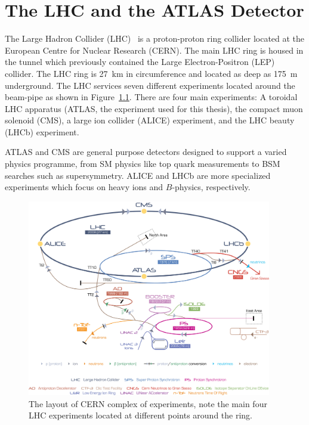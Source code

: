 \newcommand{\rphi}{\ensuremath{R\textrm{-}\phi}}
\newcommand{\T}{\ensuremath{\mathbf{T}}}
\newcommand{\Tms}{\ensuremath{\T_{\textrm{MS}}}}
\newcommand{\Tid}{\ensuremath{\T_{\textrm{ID}}}}
\newcommand{\C}{\ensuremath{\mathbf{C}}}
\newcommand{\Cms}{\ensuremath{\C_{\textrm{MS}}}}
\newcommand{\Cid}{\ensuremath{\C_{\textrm{ID}}}}
\newcommand{\kt}{\ensuremath{k_{\textrm{T}}}}
\newcommand{\kti}{\ensuremath{k_{\textrm{T},i}}}
\newcommand{\ktj}{\ensuremath{k_{\textrm{T},j}}}
\newcommand{\dij}{\ensuremath{\Delta_{ij}}}

\chapter{The LHC and the ATLAS Detector} \label{ch:Detector}

The Large Hadron Collider (LHC)~\cite{LHC} is a proton-proton ring collider located at the European Centre for Nuclear Research (CERN). The main LHC ring is housed in the tunnel which previously contained the Large Electron-Positron (LEP) collider. The LHC ring is \SI{27}{\kilo\meter} in circumference and located as deep as \SI{175}{\meter} underground. The LHC services seven different experiments located around the beam-pipe as shown in Figure~\ref{fig:DetectorLHCLayout}. There are four main experiments: A toroidal LHC apparatus (ATLAS, the experiment used for this thesis), the compact muon solenoid (CMS), a large ion collider (ALICE) experiment, and the LHC beauty (LHCb) experiment. 

ATLAS and CMS are general purpose detectors designed to support a varied physics programme, from SM physics like top quark measurements to BSM searches such as supersymmetry. ALICE and LHCb are more specialized experiments which focus on heavy ions and $B$-physics, respectively.

\begin{figure}[htbp]
  \centering
    \includegraphics[width=0.95\textwidth]{PartDetector/Diagrams/Cern-Accelerator-Complex.jpg}
    \caption{The layout of CERN complex of experiments, note the main four LHC experiments located at different points around the ring.}
  \label{fig:DetectorLHCLayout}
\end{figure}

